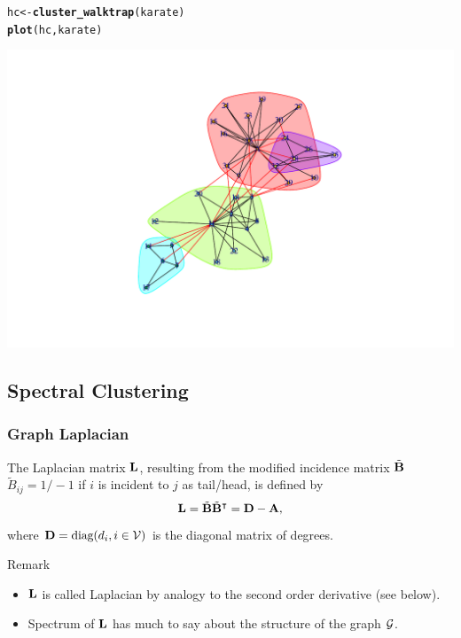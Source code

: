 \documentclass{beamer}\usepackage[]{graphicx}\usepackage[]{color}
\makeatletter
\newcommand{\hlstd}[1]{\textcolor[rgb]{0.345,0.345,0.345}{#1}}%
\newcommand{\hlkwb}[1]{\textcolor[rgb]{0.69,0.353,0.396}{#1}}%
\newcommand{\hlkwd}[1]{\textcolor[rgb]{0.737,0.353,0.396}{\textbf{#1}}}%
\newenvironment{kframe}{%
 \def\at@end@of@kframe{}%
 \ifinner\ifhmode%
  \def\at@end@of@kframe{\end{minipage}}%
  \begin{minipage}{\columnwidth}%
 \fi\fi%
 \def\FrameCommand##1{\hskip\@totalleftmargin \hskip-\fboxsep
 \colorbox{shadecolor}{##1}\hskip-\fboxsep
     \hskip-\linewidth \hskip-\@totalleftmargin \hskip\columnwidth}%
 \MakeFramed {\advance\hsize-\width
   \@totalleftmargin\z@ \linewidth\hsize
   \@setminipage}}%
 {\par\unskip\endMakeFramed%
 \at@end@of@kframe}
\newenvironment{knitrout}{}{} %
\makeatother
\begin{document}
\begin{frame}
\begin{knitrout}
\end{knitrout}

\begin{knitrout}\scriptsize
{}\color{fgcolor}\begin{kframe}
\begin{alltt}
\hlstd{hc} \hlkwb{<-} \hlkwd{cluster_walktrap}\hlstd{(karate)}
\hlkwd{plot}\hlstd{(hc,karate)}
\end{alltt}
\end{kframe}
\includegraphics[width=.8\textwidth]{figures/unnamed-chunk-3-1} 

\end{knitrout}

\end{frame}

\subsection{Spectral Clustering}

\begin{frame}
  \frametitle{Graph Laplacian}

  \begin{definition}
    The Laplacian matrix $\mathbf{L}$, resulting from the modified incidence matrix $\tilde{\mathbf{B}}$ $\tilde{\! B}_{ij}= 1/-1$ if $i$ is incident to $j$ as tail/head, is defined by 
    \[
      \mathbf{L} = \tilde {\mathbf{B}} \tilde {\mathbf{B}}^\intercal = \mathbf{D} - \mathbf{A},
    \]
    where $\mathbf{D} = \text{diag}(d_i, i\in\mathcal{V})$ is the diagonal matrix of degrees. 
  \end{definition}

  \begin{block}{Remark}
    \begin{itemize}
    \item $\mathbf{L}$ is called Laplacian by analogy to the second order derivative (see below).
    \item Spectrum of $\mathbf{L}$ has much to say about the structure of the graph $\mathcal{G}$.
    \end{itemize}
  \end{block}

\end{frame}
\end{document}

